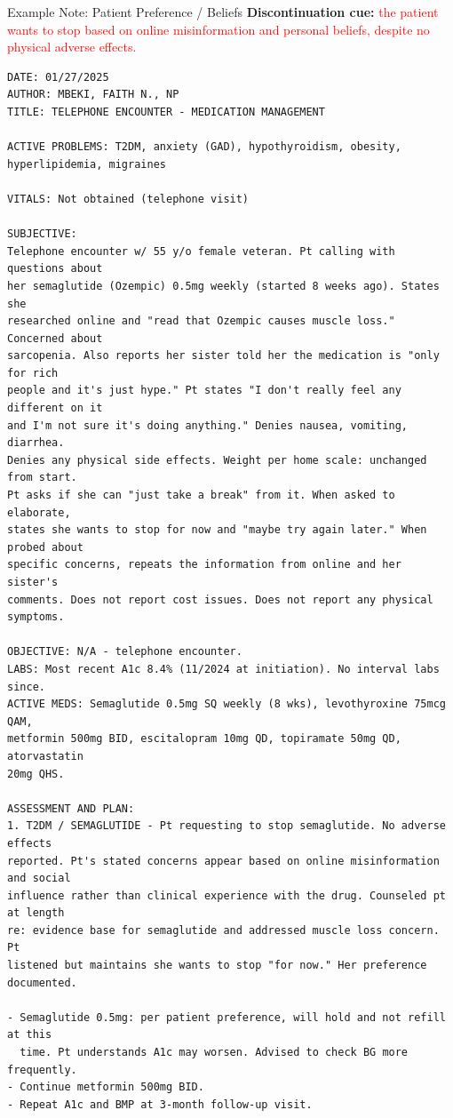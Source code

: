 \documentclass[aspectratio=169]{beamer}
\begin{document}
\begin{frame}{Example Note: Patient Preference / Beliefs}
\tiny
\textbf{Discontinuation cue:}
\textcolor{red}{the patient wants to stop based on online misinformation and personal beliefs, despite no physical adverse effects.}

\vspace{0.5em}
\begin{verbatim}
DATE: 01/27/2025
AUTHOR: MBEKI, FAITH N., NP
TITLE: TELEPHONE ENCOUNTER - MEDICATION MANAGEMENT

ACTIVE PROBLEMS: T2DM, anxiety (GAD), hypothyroidism, obesity,
hyperlipidemia, migraines

VITALS: Not obtained (telephone visit)

SUBJECTIVE:
Telephone encounter w/ 55 y/o female veteran. Pt calling with questions about
her semaglutide (Ozempic) 0.5mg weekly (started 8 weeks ago). States she
researched online and "read that Ozempic causes muscle loss." Concerned about
sarcopenia. Also reports her sister told her the medication is "only for rich
people and it's just hype." Pt states "I don't really feel any different on it
and I'm not sure it's doing anything." Denies nausea, vomiting, diarrhea.
Denies any physical side effects. Weight per home scale: unchanged from start.
Pt asks if she can "just take a break" from it. When asked to elaborate,
states she wants to stop for now and "maybe try again later." When probed about
specific concerns, repeats the information from online and her sister's
comments. Does not report cost issues. Does not report any physical symptoms.

OBJECTIVE: N/A - telephone encounter.
LABS: Most recent A1c 8.4% (11/2024 at initiation). No interval labs since.
ACTIVE MEDS: Semaglutide 0.5mg SQ weekly (8 wks), levothyroxine 75mcg QAM,
metformin 500mg BID, escitalopram 10mg QD, topiramate 50mg QD, atorvastatin
20mg QHS.

ASSESSMENT AND PLAN:
1. T2DM / SEMAGLUTIDE - Pt requesting to stop semaglutide. No adverse effects
reported. Pt's stated concerns appear based on online misinformation and social
influence rather than clinical experience with the drug. Counseled pt at length
re: evidence base for semaglutide and addressed muscle loss concern. Pt
listened but maintains she wants to stop "for now." Her preference documented.

- Semaglutide 0.5mg: per patient preference, will hold and not refill at this
  time. Pt understands A1c may worsen. Advised to check BG more frequently.
- Continue metformin 500mg BID.
- Repeat A1c and BMP at 3-month follow-up visit.
\end{verbatim}
\end{frame}
\end{document}

